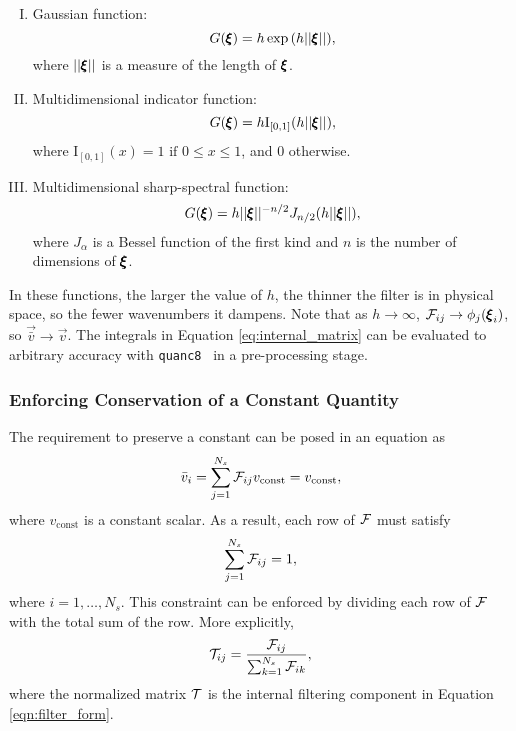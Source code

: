 \begin{enumerate}[I.]
\item Gaussian function:
\begin{equation}
G({\pmb \xi}) = h \exp{(h||{\pmb \xi}||)},
\end{equation}
where $||{\pmb \xi}||$ is a measure of the length of ${\pmb \xi}$.
\item \label{item:multi_ind_func}Multidimensional indicator function:
\begin{equation}
G({\pmb \xi}) = h\mathrm{I}_{[0,1]}(h||{\pmb \xi}||),
\end{equation}
where $\mathrm{I}_{[0,1]}(x) = 1 \text{ if } 0\le x\le 1$, and $0$ otherwise.
\item \label{item:sharp_spectral}Multidimensional sharp-spectral function:
\begin{equation}
\label{eq:sharp_spectral}
G({\pmb \xi}) = h||{\pmb \xi}||^{-n/2}
J_{n/2}(h||{\pmb \xi}||),
\end{equation}
where $J_\alpha$ is a Bessel function of the first kind and $n$ is the number of dimensions of ${\pmb \xi}$.
\end{enumerate}

In these functions, the larger the value of $h$, the thinner the filter is in physical space, so the fewer wavenumbers it dampens. Note that as $h \rightarrow \infty$, $\mathcal{F}_{ij}  \rightarrow \phi_j({\pmb \xi}_i)$, so $\vec{\bar{v}} \rightarrow \vec{{v}}$. The integrals in Equation \eqref{eq:internal_matrix} can be evaluated to arbitrary accuracy with \texttt{quanc8}~\cite{forsythe1977computer} in a pre-processing stage.

\subsubsection{Enforcing Conservation of a Constant Quantity}
The requirement to preserve a constant can be posed in an equation as
\begin{align}
\bar{v}_i = \sum^{N_s}_{j = 1} \mathcal{F}_{ij} v_{\text{const}} = v_{\text{const}},
\end{align}
where $v_{\text{const}}$ is a constant scalar. As a result, each row of $\mathcal{F}$ must satisfy
\begin{align}
\sum^{N_s}_{j = 1} \mathcal{F}_{ij} = 1,
\end{align}
where $i = 1,\dots,N_s$.
This constraint can be enforced by dividing each row of $\mathcal{F}$ with the total sum of the row. More explicitly,
\begin{align}
{\mathcal{T}}_{ij} = \frac{\mathcal{F}_{ij}}{\sum^{N_s}_{k = 1} \mathcal{F}_{ik}},
\end{align}
where the normalized matrix ${\mathcal{T}}$ is the internal filtering component in Equation \eqref{eqn:filter_form}.

